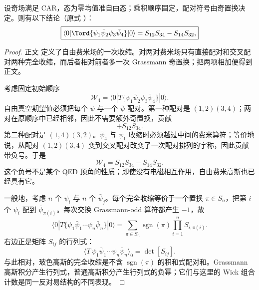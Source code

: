 \begin{proposition}
设奇场满足 CAR，态为零均值准自由态；乘积顺序固定，配对符号由奇置换决定。则有以下结论（原式 ）：
\begin{equation*}
 \boxed{
 \langle0|\Tord\{\psi_1\bar\psi_2\psi_3\bar\psi_4\}|0\rangle
 =S_{12}S_{34}-S_{14}S_{32},}
\end{equation*}
\end{proposition}
\begin{proof}
正文 定义了自由费米场的一次收缩。对两对费米场只有直接配对和交叉配对两种完全收缩，而后者相对前者多一次 Grassmann 奇置换；把两项相加便得到正文。



考虑固定初始顺序
\begin{equation*}
 \mathscr W_4
 =\langle0|T\{\psi_1\bar\psi_2\psi_3\bar\psi_4\}|0\rangle.
\end{equation*}
自由真空期望值必须把每个 $\psi$ 与一个 $\bar\psi$ 配对。第一种配对是 $(1,2)(3,4)$；两对在原顺序中已经相邻，因此不需要额外奇置换，贡献
\begin{equation*}
 +S_{12}S_{34}.
\end{equation*}
第二种配对是 $(1,4)(3,2)$。$\bar\psi_4$ 与 $\psi_1$ 收缩时必须越过中间的费米算符；等价地说，从配对 $(1,2)(3,4)$ 变到交叉配对改变了一次配对排列的宇称，因此贡献带负号。于是
\begin{equation*}
 {
 \mathscr W_4=S_{12}S_{34}-S_{14}S_{32}.}
 \end{equation*}
这个负号不是某个 QED 顶角的性质；即使没有电磁相互作用，自由费米高斯也已经具有它。

一般地，考虑 $n$ 个 $\psi_i$ 与 $n$ 个 $\bar\psi_j$。每个完全收缩等价于一个置换 $\pi\in S_n$，把第 $i$ 个 $\psi_i$ 配到 $\bar\psi_{\pi(i)}$。每次交换 Grassmann-odd 算符都产生 $-1$，故
\begin{equation*}
 \langle0|T\{\psi_1\bar\psi_1\cdots\psi_n\bar\psi_n\}|0\rangle
 =\sum_{\pi\in S_n}
 \operatorname{sgn}(\pi)
 \prod_{i=1}^{n}S_{i,\pi(i)}.
 \end{equation*}
右边正是矩阵 $S_{ij}$ 的行列式：
\begin{equation*}
 {
 \langle T\,\psi_1\bar\psi_1\cdots\psi_n\bar\psi_n\rangle_0
 =\det[S_{ij}].}
 \end{equation*}
与此相对，玻色高斯的完全收缩是不含 $\operatorname{sgn}(\pi)$ 的积和式配对和。Grassmann 高斯积分产生行列式，普通高斯积分产生行列式的负幂；它们与这里的 Wick 组合计数是同一反对易结构的不同表现。
\end{proof}

